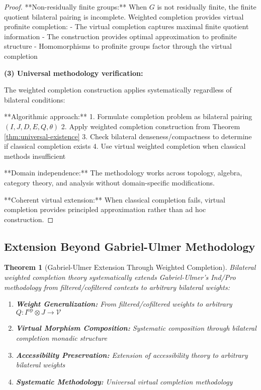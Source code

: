 \documentclass[11pt]{article}
\theoremstyle{plain}
\newtheorem{theorem}{Theorem}[section]
\theoremstyle{definition}
\theoremstyle{remark}
\newcommand{\V}{\mathcal{V}}
\newcommand{\op}{\mathrm{op}}
\begin{document}
\begin{proof}
**Non-residually finite groups:** When $G$ is not residually finite, the finite quotient bilateral pairing is incomplete. Weighted completion provides virtual profinite completion:
- The virtual completion captures maximal finite quotient information  
- The construction provides optimal approximation to profinite structure
- Homomorphisms to profinite groups factor through the virtual completion

\textbf{(3) Universal methodology verification:}

The weighted completion construction applies systematically regardless of bilateral conditions:

**Algorithmic approach:**
1. Formulate completion problem as bilateral pairing $(I, J, D, E, Q, \theta)$
2. Apply weighted completion construction from Theorem \ref{thm:universal-existence}
3. Check bilateral denseness/compactness to determine if classical completion exists
4. Use virtual weighted completion when classical methods insufficient

**Domain independence:** The methodology works across topology, algebra, category theory, and analysis without domain-specific modifications.

**Coherent virtual extension:** When classical completion fails, virtual completion provides principled approximation rather than ad hoc construction.
\end{proof}

\subsection{Extension Beyond Gabriel-Ulmer Methodology}

\begin{theorem}[Gabriel-Ulmer Extension Through Weighted Completion]\label{thm:gabriel-ulmer-extension}
Bilateral weighted completion theory systematically extends Gabriel-Ulmer's Ind/Pro methodology from filtered/cofiltered contexts to arbitrary bilateral weights:

\begin{enumerate}
\item \textbf{Weight Generalization:} From filtered/cofiltered weights to arbitrary $Q : I^{\op} \otimes J \to \V$

\item \textbf{Virtual Morphism Composition:} Systematic composition through bilateral completion monadic structure

\item \textbf{Accessibility Preservation:} Extension of accessibility theory to arbitrary bilateral weights

\item \textbf{Systematic Methodology:} Universal virtual completion methodology
\end{enumerate}
\end{theorem}
\end{document}
